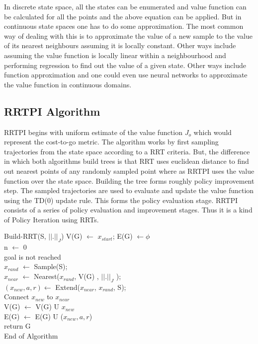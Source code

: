 \documentclass[MTech]{iitmdiss}
\begin{document}
In discrete state space, all the states can be enumerated and value function can be calculated for all the points and the above equation can be applied. But in continuous state spaces one has to do some approximation. The most common way of dealing with this is to approximate the value of a new sample to the value of its nearest neighbours assuming it is locally constant. Other ways include assuming the value function is locally linear within a neighbourhood and performing regression to find out the value of a given state. Other ways include function approximation and one could even use neural networks 
\cite{thrun93}
to approximate the value function in continuous domains.

\subsection{RRTPI Algorithm}

RRTPI begins with uniform estimate of the value function $J_o$ which would represent the cost-to-go metric. The algorithm works by first sampling trajectories from the state space according to a RRT criteria. But, the difference in which both algorithms build trees is that RRT uses euclidean distance to find out nearest points of any randomly sampled point where as RRTPI uses the value function over the state space. Building the tree forms roughly policy improvement step. The sampled trajectories are used to evaluate and update the value function using the TD(0) update rule. This forms the policy evaluation stage. RRTPI consists of a series of policy evaluation and improvement stages. Thus it is a kind of Policy Iteration using RRTs. 

\begin{algorithm}{Build-RRT(S, $|| . ||_J$)}{
\label{algo:Build-RRT}
}
 V(G) $\leftarrow$ {$x_{start}$};  E(G) $\leftarrow${$\phi$ } \\
 n $\leftarrow$ 0\\
\qwhile goal is not reached \\
$x_{rand}$ $\leftarrow$ Sample(S);\\
$x_{near}$ $\leftarrow$ Nearest($x_{rand}$, V(G) , $|| . ||_J $ );\\
$(x_{new}, a, r) \leftarrow$ Extend($x_{near}$, $x_{rand}$, S);\\
Connect $x_{new}$ to $x_{near}$\\
V(G) $\leftarrow$ V(G) U {$ x_{new}$ }\\
E(G) $\leftarrow$ E(G) U ($x_{new}, a, r$)\qend\\
return G\\
End of Algorithm
\end{algorithm}
\end{document}
